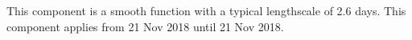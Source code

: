 This component is a smooth function with a typical lengthscale of 2.6 days.
This component applies from 21 Nov 2018 until 21 Nov 2018.